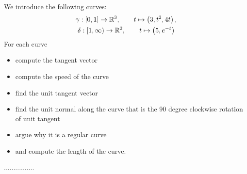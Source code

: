 \documentclass[11pt]{article}
\begin{document}
\begin{exercise}
    We introduce the following curves:
    \begin{gather*}
        \gamma : [0,1] \rightarrow \mathbb{R}^{3}, \qquad t \mapsto \left( 3, t^2, 4t \right),
        \\
        \delta : [1,\infty) \rightarrow \mathbb{R}^{2}, \qquad t \mapsto \left( 5, e^{-t} \right)
    \end{gather*}
    For each curve
    \begin{itemize}
        \item compute the tangent vector
        \item compute the speed of the curve
        \item find the unit tangent vector
        \item find the unit normal along the curve that is the 90 degree clockwise rotation of unit tangent
        \item argue why it is a regular curve
        \item and compute the length of the curve.
    \end{itemize}
\end{exercise}
\begin{solution}
    ................
\end{solution}
\end{document}
